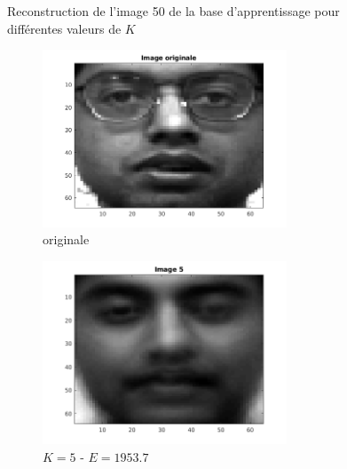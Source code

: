 \documentclass[a4paper]{article}
\begin{document}
\begin{figure}[H]
    \caption{Reconstruction de l'image 50 de la base d'apprentissage pour
    différentes valeurs de $K$} 
    \label{fig:ex3-x50}
\end{figure}

\begin{figure}[H]
    \centering
     
    \begin{subfigure}[c]{0.3\textwidth}
        \centering
        \includegraphics[width=0.8\textwidth]{images/ex3_55_originale.png}
        \caption{originale}
        \label{subfig:ex3_55_originale}
    \end{subfigure}
    \begin{subfigure}[c]{0.3\textwidth}
        \centering
        \includegraphics[width=0.8\textwidth]{images/ex3_55_5.png}
        \caption{$K=5$ - $E = 1953.7$}
        \label{subfig:ex3_55_5}
    \end{subfigure}
    \begin{subfigure}[c]{0.3\textwidth}
        \centering

\end{subfigure}
\end{figure}
\end{document}
